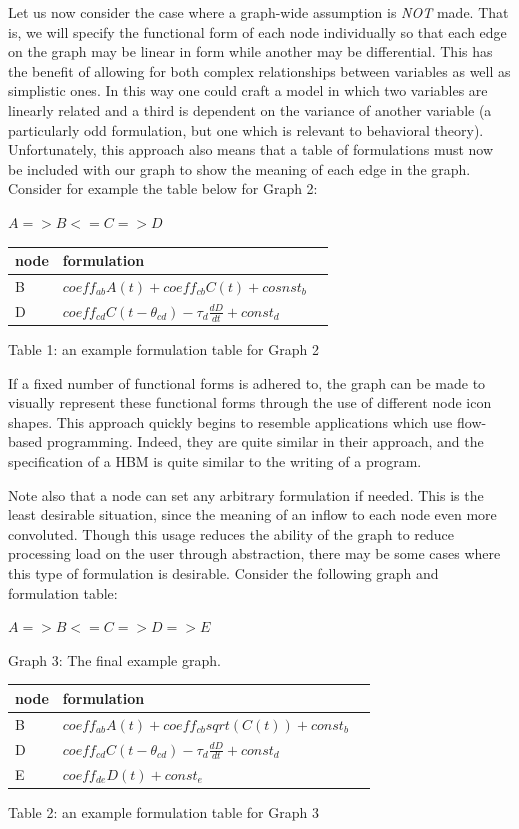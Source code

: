 \documentclass[conference]{IEEEtran}
\begin{document}
Let us now consider the case where a graph-wide assumption is \emph{NOT} made.
That is, we will specify the functional form of each node individually so that each edge on the graph may be linear in form while another may be differential.
This has the benefit of allowing for both complex relationships between variables as well as simplistic ones.
In this way one could craft a model in which two variables are linearly related and a third is dependent on the variance of another variable (a particularly odd formulation, but one which is relevant to behavioral theory).
Unfortunately, this approach also means that a table of formulations must now be included with our graph to show the meaning of each edge in the graph.
Consider for example the table below for Graph 2:

$A => B <= C => D$


\begin{centering}
\begin{tabular}{ | l | l | l |}
    \hline
    node & formulation \\ \hline
    B & $coeff_{ab}A(t) + coeff_{cb}C(t) + cosnst_b$  \\ \hline
    D & $coeff_{cd}C(t-\theta_{cd}) - \tau_{d}\frac{dD}{dt} + const_d$ \\ \hline
\end{tabular}
Table 1: an example formulation table for Graph 2 
\end{centering}


If a fixed number of functional forms is adhered to, the graph can be made to visually represent these functional forms through the use of different node icon shapes. 
This approach quickly begins to resemble applications which use flow-based programming. 
Indeed, they are quite similar in their approach, and the specification of a HBM is quite similar to the writing of a program.

Note also that a node can set any arbitrary formulation if needed. 
This is the least desirable situation, since the meaning of an inflow to each node even more convoluted. 
Though this usage reduces the ability of the graph to reduce processing load on the user through abstraction, there may be some cases where this type of formulation is desirable. 
Consider the following graph and formulation table:

$A => B <= C => D => E$

Graph 3: The final example graph.

\begin{centering}
\begin{tabular}{ | l | l | l |}
    \hline
    node & formulation \\ \hline
    B & $coeff_{ab}A(t) + coeff_{cb}sqrt(C(t)) + const_b$ \\ \hline
    D & $coeff_{cd}C(t-\theta_{cd}) - \tau_{d}\frac{dD}{dt} + const_{d}$ \\ \hline
    E & $coeff_{de}D(t) + const_{e}$ \\ \hline
\end{tabular}
Table 2: an example formulation table for Graph 3
\end{centering}
\end{document}
